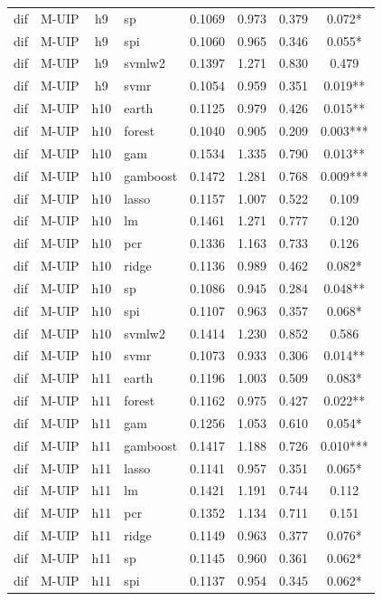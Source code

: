 \begin{ThreePartTable}
\begin{longtable}[t]{llclcccc}
dif & M-UIP & h9 & sp & 0.1069 & 0.973 & 0.379 & 0.072*\\
dif & M-UIP & h9 & spi & 0.1060 & 0.965 & 0.346 & 0.055*\\
dif & M-UIP & h9 & svmlw2 & 0.1397 & 1.271 & 0.830 & 0.479\\
dif & M-UIP & h9 & svmr & 0.1054 & 0.959 & 0.351 & 0.019**\\
\addlinespace
dif & M-UIP & h10 & earth & 0.1125 & 0.979 & 0.426 & 0.015**\\
dif & M-UIP & h10 & forest & 0.1040 & 0.905 & 0.209 & 0.003***\\
dif & M-UIP & h10 & gam & 0.1534 & 1.335 & 0.790 & 0.013**\\
dif & M-UIP & h10 & gamboost & 0.1472 & 1.281 & 0.768 & 0.009***\\
dif & M-UIP & h10 & lasso & 0.1157 & 1.007 & 0.522 & 0.109\\
dif & M-UIP & h10 & lm & 0.1461 & 1.271 & 0.777 & 0.120\\
dif & M-UIP & h10 & pcr & 0.1336 & 1.163 & 0.733 & 0.126\\
dif & M-UIP & h10 & ridge & 0.1136 & 0.989 & 0.462 & 0.082*\\
dif & M-UIP & h10 & sp & 0.1086 & 0.945 & 0.284 & 0.048**\\
dif & M-UIP & h10 & spi & 0.1107 & 0.963 & 0.357 & 0.068*\\
dif & M-UIP & h10 & svmlw2 & 0.1414 & 1.230 & 0.852 & 0.586\\
dif & M-UIP & h10 & svmr & 0.1073 & 0.933 & 0.306 & 0.014**\\
\addlinespace
dif & M-UIP & h11 & earth & 0.1196 & 1.003 & 0.509 & 0.083*\\
dif & M-UIP & h11 & forest & 0.1162 & 0.975 & 0.427 & 0.022**\\
dif & M-UIP & h11 & gam & 0.1256 & 1.053 & 0.610 & 0.054*\\
dif & M-UIP & h11 & gamboost & 0.1417 & 1.188 & 0.726 & 0.010***\\
dif & M-UIP & h11 & lasso & 0.1141 & 0.957 & 0.351 & 0.065*\\
dif & M-UIP & h11 & lm & 0.1421 & 1.191 & 0.744 & 0.112\\
dif & M-UIP & h11 & pcr & 0.1352 & 1.134 & 0.711 & 0.151\\
dif & M-UIP & h11 & ridge & 0.1149 & 0.963 & 0.377 & 0.076*\\
dif & M-UIP & h11 & sp & 0.1145 & 0.960 & 0.361 & 0.062*\\
dif & M-UIP & h11 & spi & 0.1137 & 0.954 & 0.345 & 0.062*\\

\end{longtable}
\end{ThreePartTable}
